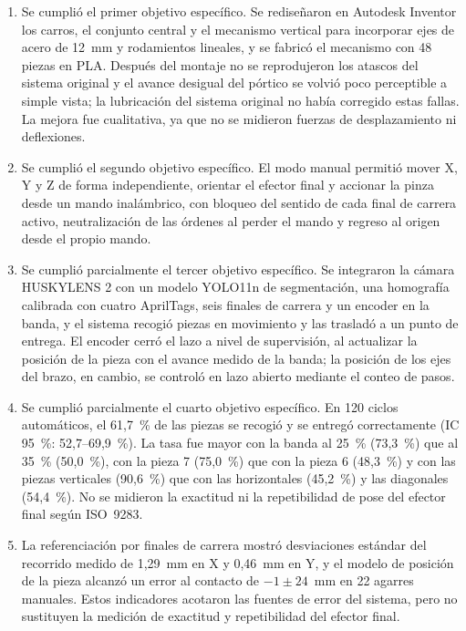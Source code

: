 \begin{enumerate}
	\item Se cumplió el primer objetivo específico. Se rediseñaron en Autodesk Inventor los carros, el conjunto central y el mecanismo vertical para incorporar ejes de acero de 12~mm y rodamientos lineales, y se fabricó el mecanismo con 48 piezas en PLA. Después del montaje no se reprodujeron los atascos del sistema original y el avance desigual del pórtico se volvió poco perceptible a simple vista; la lubricación del sistema original no había corregido estas fallas. La mejora fue cualitativa, ya que no se midieron fuerzas de desplazamiento ni deflexiones.

	\item Se cumplió el segundo objetivo específico. El modo manual permitió mover X, Y y Z de forma independiente, orientar el efector final y accionar la pinza desde un mando inalámbrico, con bloqueo del sentido de cada final de carrera activo, neutralización de las órdenes al perder el mando y regreso al origen desde el propio mando.

	\item Se cumplió parcialmente el tercer objetivo específico. Se integraron la cámara HUSKYLENS 2 con un modelo YOLO11n de segmentación, una homografía calibrada con cuatro AprilTags, seis finales de carrera y un encoder en la banda, y el sistema recogió piezas en movimiento y las trasladó a un punto de entrega. El encoder cerró el lazo a nivel de supervisión, al actualizar la posición de la pieza con el avance medido de la banda; la posición de los ejes del brazo, en cambio, se controló en lazo abierto mediante el conteo de pasos.

	\item Se cumplió parcialmente el cuarto objetivo específico. En 120 ciclos automáticos, el 61,7~\% de las piezas se recogió y se entregó correctamente (IC 95~\%: 52,7--69,9~\%). La tasa fue mayor con la banda al 25~\% (73,3~\%) que al 35~\% (50,0~\%), con la pieza 7 (75,0~\%) que con la pieza 6 (48,3~\%) y con las piezas verticales (90,6~\%) que con las horizontales (45,2~\%) y las diagonales (54,4~\%). No se midieron la exactitud ni la repetibilidad de pose del efector final según ISO~9283.

	\item La referenciación por finales de carrera mostró desviaciones estándar del recorrido medido de 1,29~mm en X y 0,46~mm en Y, y el modelo de posición de la pieza alcanzó un error al contacto de $-1\pm24$~mm en 22 agarres manuales. Estos indicadores acotaron las fuentes de error del sistema, pero no sustituyen la medición de exactitud y repetibilidad del efector final.


\end{enumerate}
